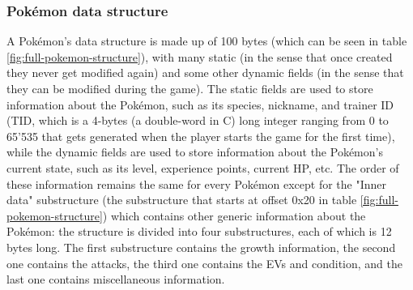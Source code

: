 \documentclass[a4paper]{usiinfbachelorproject}
\begin{document}
\subsubsection{Pokémon data structure}
\label{sec:data_structure}
A Pokémon's data structure is made up of 100 bytes (which can be seen in table \ref{fig:full-pokemon-structure}), with many static (in the sense that once created they never get modified again) and some other dynamic fields (in the sense that they can be modified during the game). The static fields are used to store information about the Pokémon, such as its species, nickname, and trainer ID (TID, which is a 4-bytes (a double-word in C) long integer ranging from 0 to 65'535 that gets generated when the player starts the game for the first time), while the dynamic fields are used to store information about the Pokémon's current state, such as its level, experience points, current HP, etc.
The order of these information remains the same for every Pokémon except for the "Inner data" substructure (the substructure that starts at offset 0x20 in table \ref{fig:full-pokemon-structure}) which contains other generic information about the Pokémon: the structure is divided into four substructures, each of which is 12 bytes long. The first substructure contains the growth information, the second one contains the attacks, the third one contains the EVs and condition, and the last one contains miscellaneous information.
\end{document}
